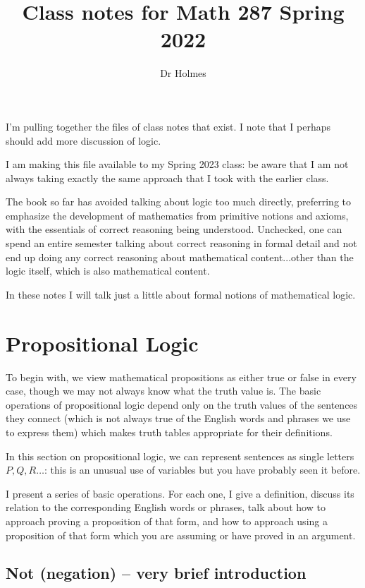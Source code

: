 \documentclass[12pt]{article}
\title{Class notes for Math 287 Spring 2022}
\author{Dr Holmes}
\begin{document}
\maketitle

I'm pulling together the files of class notes that exist.  I note that I perhaps should add more discussion of logic.

I am making this file available to my Spring 2023 class:  be aware that I am not always taking exactly the same approach that I took with the earlier class.

\tableofcontents

\newpage

The book so far has avoided talking about logic too much directly, preferring to emphasize the development of mathematics from primitive notions and axioms, with the essentials of correct reasoning being understood.  Unchecked, one can spend an entire semester talking about correct reasoning in formal detail and not end up doing any correct reasoning about mathematical content...other than the logic itself, which is also mathematical content.

In these notes I will talk just a little about formal notions of mathematical logic.

\section{Propositional Logic}

To begin with, we view mathematical propositions as either true or false in every case, though we may not always know what the truth value is.  The basic operations of propositional logic depend only on the truth values of the sentences they connect (which is not always true of the English words and phrases we use to express them) which makes truth tables appropriate for their definitions.

In this section on propositional logic, we can represent sentences as single letters $P,Q,R\ldots$:  this is an unusual use of variables but you have probably seen it before.

I present a series of basic operations.  For each one, I give a definition, discuss its relation to the corresponding English words or phrases, talk about how to approach proving a proposition of that form, and how to approach using a proposition of that form which you are assuming or have proved in an argument.

\subsection{Not (negation) -- very brief introduction}
\end{document}
